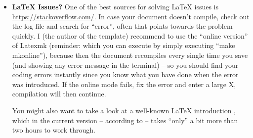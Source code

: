 \begin{itemize}
  In addition to the commands \verb!citep{}! and \verb!cite{}!, \verb!\citeauthor{}! is sometimes useful. This just lists the author(s), but without the year. I.e., it's an alternative  to \verb!cite{}! that you should use when you want to mention the authors whereas you used similar citations before so that there is just no need to add the year again.
  
  Also note that you can easily cite multiple works with one command as shown in (the code of) this sentence \citep{Cooper2015SuperfluidVacuumTheory,Smith2021Wubalubadubdub}.

  
  \item \textbf{\LaTeX{} Issues?} One of the best sources for solving \LaTeX{} issues is \url{https://stackoverflow.com/}. In case your document doesn't compile, check out the log file and search for ``error'', often that points towards the problem quickly. I (the author of the template) recommend to use the ``online version'' of Latexmk (reminder: which you can execute by simply executing ``make mkonline''), because then the document recompiles every single time you save (and showing any error message in the terminal) -- so you should find your coding errors instantly since you know what you have done when the error was introduced. If the online mode fails, fix the error and enter a large X, compilation will then continue.

  You might also want to take a look at a well-known \LaTeX{} introduction \citep{Oetiker2021LatexIntroduction}, which in the current version -- according to \citeauthor{Oetiker2021LatexIntroduction} -- takes ``only'' a bit more than two hours to work through.
\end{itemize}
